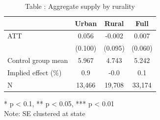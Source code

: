 \begin{table}[t]
\caption*{
{\fontsize{20}{25}\selectfont  Table : Aggregate supply by rurality\fontsize{12}{15}\selectfont }
} 
\fontsize{12.0pt}{14.0pt}\selectfont
\begin{tabular*}{\linewidth}{@{\extracolsep{\fill}}lccc}
\toprule
  & Urban & Rural & Full \\ 
\midrule\addlinespace[2.5pt]
ATT & 0.056 & -0.002 & 0.007 \\ 
 & (0.100) & (0.095) & (0.060) \\ 
Control group mean & 5.967 & 4.743 & 5.242 \\ 
Implied effect (\%) & 0.9 & -0.0 & 0.1 \\ 
N & 13,466 & 19,708 & 33,174 \\ 
\bottomrule
\end{tabular*}
\begin{minipage}{\linewidth}
* p < 0.1, ** p < 0.05, *** p < 0.01\\
Note: SE clustered at state\\
\end{minipage}
\end{table}

